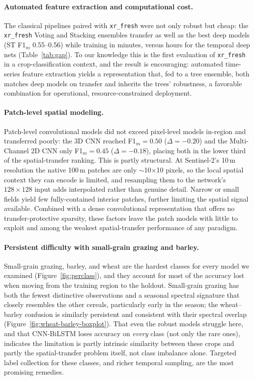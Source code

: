 \documentclass[pdflatex,sn-mathphys]{sn-jnl} %
\begin{document}
\paragraph{Automated feature extraction and computational cost.}

The classical pipelines paired with \texttt{xr\_fresh} were not only robust but
cheap: the \texttt{xr\_fresh} Voting and Stacking ensembles transfer as well as the best
deep models (ST F1$_m$ 0.55–0.56) while training in minutes, versus
hours for the temporal deep nets (Table~\ref{tab:gap}). To our knowledge this is
the first evaluation of \texttt{xr\_fresh} in a crop-classification context, and
the result is encouraging: automated time-series feature extraction yields a
representation that, fed to a tree ensemble, both matches deep models on transfer
and inherits the trees' robustness, a favorable combination for operational,
resource-constrained deployment.

\paragraph{Patch-level spatial modeling.}

Patch-level convolutional models did not exceed pixel-level models in-region and
transferred poorly: the 3D CNN reached F1$_m=0.50$ ($\Delta=-0.20$) and the
Multi-Channel 2D CNN only F1$_m=0.45$ ($\Delta=-0.18$), placing both in the lower
third of the spatial-transfer ranking. This is partly structural. At
Sentinel-2's 10\,m resolution the native 100\,m patches are only $\sim$10$\times$10
pixels, so the local spatial context they can encode is limited, and resampling them
to the network's $128\times128$ input adds interpolated rather than genuine detail.
Narrow or small fields yield few fully-contained interior patches, further limiting
the spatial signal available. Combined with a dense convolutional representation that
offers no transfer-protective sparsity, these factors leave the patch models with
little to exploit and among the weakest spatial-transfer performance of any paradigm.

\paragraph{Persistent difficulty with small-grain grazing and barley.}

Small-grain grazing, barley, and wheat are the hardest classes for every model we
examined (Figure~\ref{fig:perclass}), and they account for most of the accuracy lost
when moving from the training region to the holdout. Small-grain grazing has both
the fewest distinctive observations and a seasonal spectral signature that closely
resembles the other cereals, particularly early in the season; the wheat–barley
confusion is similarly persistent and consistent with their spectral overlap
(Figure~\ref{fig:wheat-barley-boxplot}). That even the robust models struggle here,
and that CNN-BiLSTM loses accuracy on \emph{every} class (not only the rare ones),
indicates the limitation is partly intrinsic similarity between these crops and
partly the spatial-transfer problem itself, not class imbalance alone. Targeted
label collection for these classes, and richer temporal sampling, are the most
promising remedies.
\end{document}

